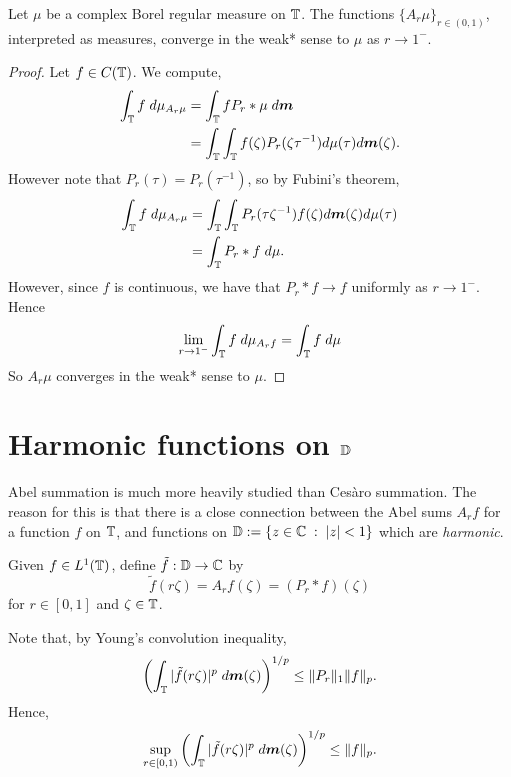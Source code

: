 \begin{proposition}
    Let $\mu$ be a complex Borel regular measure on $\mathbb{T}$. The functions $\{A_r \mu\}_{r \in (0,1)}$,
    interpreted as measures, converge in the weak* sense to $\mu$ as $r\rightarrow 1^-$.
\end{proposition}
\begin{proof}
    Let $f \in C(\mathbb{T})$. We compute,
    \begin{align*}
        \int_{\mathbb{T}} f\;d\mu_{A_r\mu} &= \int_{\mathbb{T}} fP_r*\mu\;d\boldsymbol{m}\\
        &= \int_{\mathbb{T}}\int_{\mathbb{T}} f(\zeta) P_r(\zeta\tau^{-1}) d\mu(\tau)d\boldsymbol{m}(\zeta).
    \end{align*}
    However note that $P_r(\tau) = P_r(\tau^{-1})$, so by Fubini's theorem,
    \begin{align*}
        \int_{\mathbb{T}} f\;d\mu_{A_r \mu} &= \int_{\mathbb{T}} \int_{\mathbb{T}} P_r(\tau\zeta^{-1})f(\zeta)d\boldsymbol{m}(\zeta)d\mu(\tau)\\
        &= \int_{\mathbb{T}} P_r*f \;d\mu.
    \end{align*}
    However, since $f$ is continuous, we have that $P_r*f\rightarrow f$ uniformly
    as $r\rightarrow 1^-$. Hence
    \begin{equation*}
        \lim_{r\rightarrow 1^-} \int_{\mathbb{T}} f\;d\mu_{A_rf} = \int_{\mathbb{T}} f\;d\mu
    \end{equation*}
    So $A_r\mu$ converges in the weak* sense to $\mu$.
\end{proof}

\section{Harmonic functions on $\mathbb{D}$}
Abel summation is much more heavily studied than Ces\`aro summation. The reason
for this is that there is a close connection between the Abel sums $A_r f$
for a function $f$ on $\mathbb{T}$, and functions on $\mathbb{D} := \{ z \in \mathbb{C}\;:\; |z| < 1\}$
which are \emph{harmonic}.

Given $f \in L^1(\mathbb{T})$, define $\tilde{f}:\mathbb{D}\rightarrow\mathbb{C}$
by
\begin{equation*}
    \tilde{f}(r\zeta) = A_rf(\zeta) = (P_r*f)(\zeta)
\end{equation*}
for $r \in [0,1]$ and $\zeta \in \mathbb{T}$.

Note that, by Young's convolution inequality,
\begin{equation*}
    \left(\int_{\mathbb{T}} |\tilde{f}(r\zeta)|^p\;d\boldsymbol{m}(\zeta)\right)^{1/p} \leq \|P_r\|_1 \|f\|_{p}.
\end{equation*}
Hence,
\begin{equation*}
    \sup_{r \in [0,1)} \left(\int_{\mathbb{T}} |\tilde{f}(r\zeta)|^p\;d\boldsymbol{m}(\zeta)\right)^{1/p} \leq \|f\|_p.
\end{equation*} 



